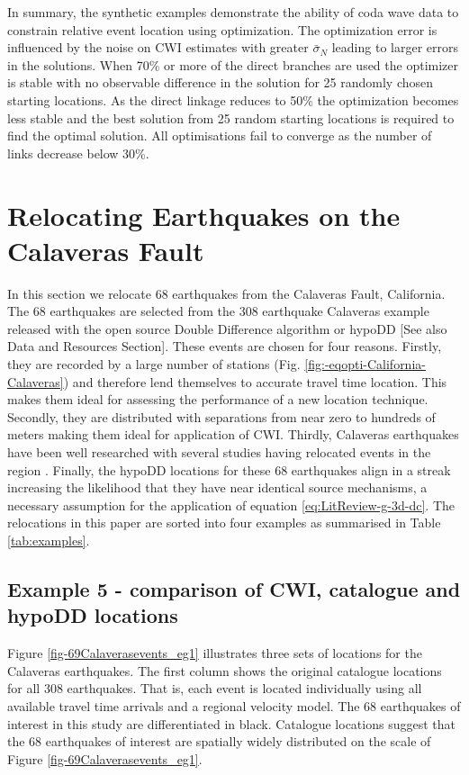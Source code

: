\documentclass[extra, onecolumn, doublespacing]{gji}
\begin{document}
In summary, the synthetic examples demonstrate the ability of coda
wave data to constrain relative event location using optimization.
The optimization error is influenced by the noise on CWI estimates
with greater $\bar{\sigma}_N$ leading to larger errors in the
solutions. When 70\% or more of the direct branches are used the
optimizer is stable with no observable difference in the solution
for 25 randomly chosen starting locations. As the direct linkage
reduces to 50\% the optimization becomes less stable and the best
solution from 25 random starting locations is required to find the
optimal solution. All optimisations fail to converge as the number
of links decrease below 30\%.


\section{Relocating Earthquakes on the Calaveras Fault}
\label{sec:CalaverasLoc-CWIonly}

In this section we relocate 68 earthquakes from the Calaveras Fault,
California. The 68 earthquakes are selected from the 308 earthquake
Calaveras example released with the open source Double Difference
algorithm or hypoDD \citep{dr_Waldhauser00a, dr_Waldhauser01a} [See
also Data and Resources Section]. These events are chosen for four
reasons. Firstly, they are recorded by a large number of stations
(Fig. \ref{fig:-eqopti-California-Calaveras}) and therefore lend
themselves to accurate travel time location. This makes them ideal
for assessing the performance of a new location technique. Secondly,
they are distributed with separations from near zero to hundreds of
meters making them ideal for application of CWI. Thirdly, Calaveras
earthquakes have been well researched with several studies having
relocated events in the region \citep{dr_Waldhauser01a,
dr_Schaff02a, dr_Waldhauser08a}. Finally, the hypoDD locations for
these 68 earthquakes align in a streak increasing the likelihood
that they have near identical source mechanisms, a necessary
assumption for the application of equation
\ref{eq:LitReview-g-3d-dc}. The relocations in this paper are sorted
into four examples as summarised in Table \ref{tab:examples}.

\subsection{Example 5 - comparison of CWI, catalogue and hypoDD locations}

Figure \ref{fig-69Calaverasevents_eg1} illustrates three sets of
locations for the Calaveras earthquakes. The first column shows the
original catalogue locations for all 308 earthquakes. That is, each event
is located individually using all available travel time arrivals and
a regional velocity model. The 68 earthquakes of interest in this
study are differentiated in black. Catalogue locations suggest that
the 68 earthquakes of interest are spatially widely distributed on the scale of
 Figure \ref{fig-69Calaverasevents_eg1}.
\end{document}
